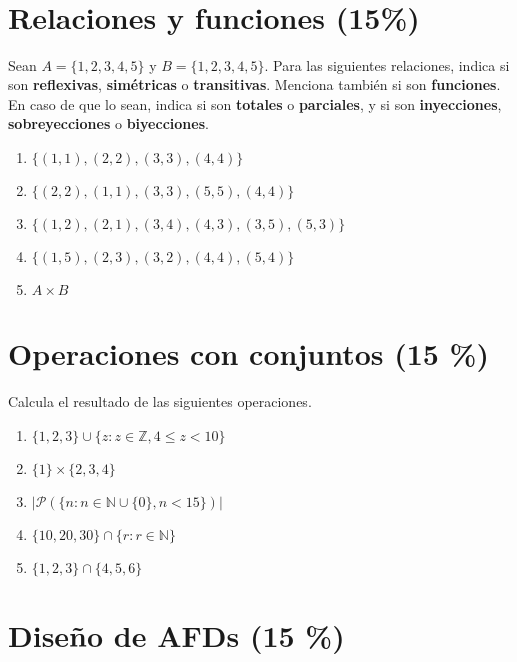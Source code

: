 \documentclass[8pt, onside]{article}
\title{
    {\blue \myclass} \\
    {\blueb \mytitle} \\
    \myheader
    \date{}
}
\begin{document}
\maketitle

\vspace{-2cm}

\section{Relaciones y funciones (15\%)}

Sean $A = \{1,2,3,4,5\}$ y $B = \{1,2,3,4,5\}$.
Para las siguientes relaciones, indica si son \textbf{reflexivas}, \textbf{simétricas} o \textbf{transitivas}.
Menciona también si son \textbf{funciones}. En caso de que lo sean, indica si son \textbf{totales} o \textbf{parciales}, y si son \textbf{inyecciones}, \textbf{sobreyecciones} o \textbf{biyecciones}.

\begin{enumerate}[label=\tt \alph*)]
    \itemsep1.5em
    \item $\{(1,1), (2,2), (3,3), (4,4)\}$
    \item $\{(2,2), (1,1), (3,3), (5,5), (4,4)\}$
    \item $\{(1,2), (2,1), (3,4), (4,3), (3,5), (5,3)\}$
    \item $\{(1,5), (2,3), (3,2), (4,4), (5, 4)\}$
    \item $A \times B$
\end{enumerate}


\section{Operaciones con conjuntos (15 \%)}

Calcula el resultado de las siguientes operaciones.

\begin{enumerate}[label=\tt \alph*)]
    \itemsep1.5em
    \item $\{1, 2, 3\} \cup \{z : z \in \mathbb{Z}, 4 \leq z < 10 \}$
    \item $\{1\} \times \{2,3,4\}$
    \item $|\mathscr{P}(\{n : n \in \mathbb{N} \cup \{0\}, n < 15\})|$
    \item $\{10, 20, 30\} \cap \{r : r \in \mathbb{N}\}$
    \item $\{1, 2, 3\} \cap \{4, 5, 6\}$
\end{enumerate}


\section{Diseño de AFDs (15 \%)}
\end{document}
